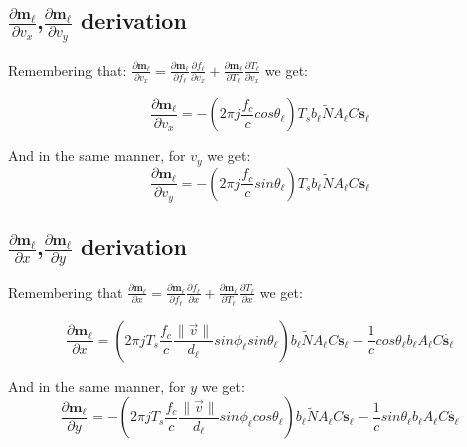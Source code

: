 \subsection{$\frac{\partial \mathbf{m_\ell }}{\partial v_x}$,$\frac{\partial \mathbf{m_\ell }}{\partial v_y}$ derivation}

Remembering that:
$\frac{\partial \mathbf{m_\ell }}{\partial v_x} = \frac{\partial \mathbf{m_\ell }}{\partial f_\ell }\frac{\partial f_\ell }{\partial v_x} + \frac{\partial \mathbf{m_\ell }}{\partial T_\ell }\frac{\partial T_\ell }{\partial v_x}$
we get:

\begin{equation}
\frac{\partial \mathbf{m_\ell }}{\partial v_x} = -(2 \pi j \frac{f_c}{c} cos\theta_\ell ) T_s b_\ell  \tilde{N} A_\ell  C \mathbf{s_\ell }
\end{equation}

And in the same manner, for $v_y$ we get:
\begin{equation}
\frac{\partial \mathbf{m_\ell }}{\partial v_y} = -(2 \pi j \frac{f_c}{c} sin\theta_\ell ) T_s b_\ell  \tilde{N} A_\ell  C \mathbf{s_\ell }
\end{equation}

\subsection{$\frac{\partial \mathbf{m_\ell }}{\partial x}$,$\frac{\partial \mathbf{m_\ell }}{\partial y}$ derivation}
Remembering that 
$\frac{\partial \mathbf{m_\ell }}{\partial x} = \frac{\partial \mathbf{m_\ell }}{\partial f_\ell }\frac{\partial f_\ell }{\partial x} + \frac{\partial \mathbf{m_\ell }}{\partial T_\ell }\frac{\partial T_\ell }{\partial x}$
we get:

\begin{equation}
\frac{\partial \mathbf{m_\ell }}{\partial x} = (2 \pi j T_s \frac{f_c}{c} \frac{\|\vec{v}\|}{d_\ell } sin\phi_\ell  sin\theta_\ell )b_\ell  \tilde{N} A_\ell  C \mathbf{s_\ell } -\frac{1}{c}cos\theta_\ell  b_\ell  A_\ell  C \dot{\mathbf{s_\ell }}
\end{equation}

And in the same manner, for $y$ we get:
\begin{equation}
\frac{\partial \mathbf{m_\ell }}{\partial y} = -(2 \pi j T_s \frac{f_c}{c} \frac{\|\vec{v}\|}{d_\ell } sin\phi_\ell  cos\theta_\ell )b_\ell  \tilde{N} A_\ell  C \mathbf{s_\ell } -\frac{1}{c}sin\theta_\ell  b_\ell  A_\ell  C \dot{\mathbf{s_\ell }}
\end{equation}


